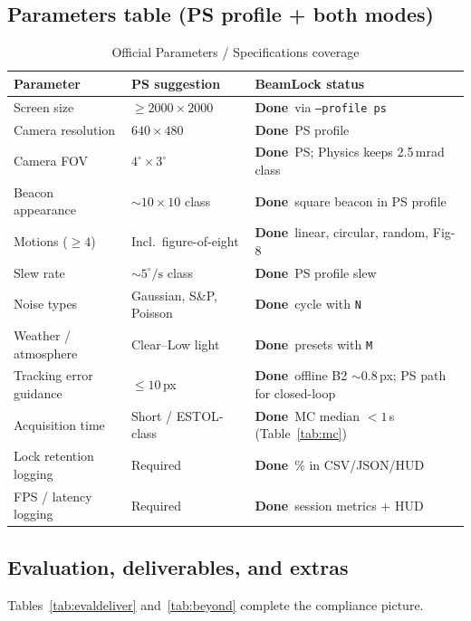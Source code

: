 \documentclass[11pt,a4paper]{article}
\newcommand{\Done}{\textcolor{DoneGreen}{\textbf{Done}}}
\begin{document}
\subsection{Parameters table (PS profile + both modes)}
\begin{table}[H]
\centering
\caption{Official Parameters / Specifications coverage}
\label{tab:paramsfull}
\footnotesize
\begin{tabular}{@{}p{3.5cm}p{4.0cm}p{5.2cm}@{}}
\toprule
\textbf{Parameter} & \textbf{PS suggestion} & \textbf{BeamLock status} \\
\midrule
Screen size & $\ge 2000\times2000$ & \Done\ via \texttt{--profile ps} \\
Camera resolution & $640\times480$ & \Done\ PS profile \\
Camera FOV & $4^\circ\times3^\circ$ & \Done\ PS; Physics keeps 2.5\,mrad class \\
Beacon appearance & $\sim10\times10$ class & \Done\ square beacon in PS profile \\
Motions ($\ge4$) & Incl.\ figure-of-eight & \Done\ linear, circular, random, Fig-8 \\
Slew rate & $\sim5^\circ/\mathrm{s}$ class & \Done\ PS profile slew \\
Noise types & Gaussian, S\&P, Poisson & \Done\ cycle with \texttt{N} \\
Weather / atmosphere & Clear--Low light & \Done\ presets with \texttt{M} \\
Tracking error guidance & $\le10$\,px & \Done\ offline B2 $\sim$0.8\,px; PS path for closed-loop \\
Acquisition time & Short / ESTOL-class & \Done\ MC median $<1$\,s (Table~\ref{tab:mc}) \\
Lock retention logging & Required & \Done\ \% in CSV/JSON/HUD \\
FPS / latency logging & Required & \Done\ session metrics + HUD \\
\bottomrule
\end{tabular}
\end{table}

\subsection{Evaluation, deliverables, and extras}
Tables~\ref{tab:evaldeliver} and~\ref{tab:beyond} complete the compliance picture.
\end{document}
